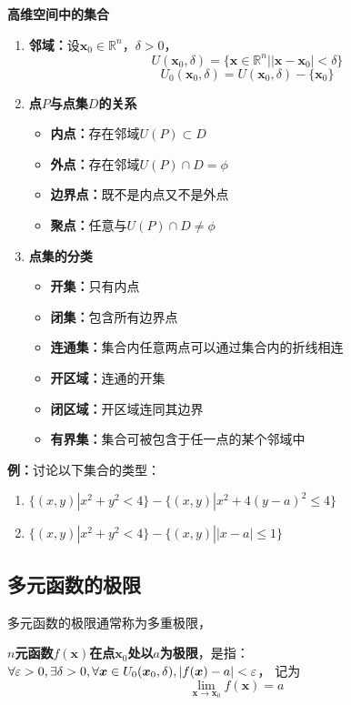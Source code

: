 \begin{shaded}
	{\bf 高维空间中的集合}
	
	\begin{enumerate}
	  \item {\bf 邻域：}设$\bm{x}_0\in\mathbb{R}^n$，$\delta>0$，
	  $$U(\bm{x}_0,\delta)=\{\bm{x}\in\mathbb{R}^n||\bm{x}-\bm{x}_0|<\delta\}$$
	  $$U_0(\bm{x}_0,\delta)=U(\bm{x}_0,\delta)-\{\bm{x}_0\}$$
	  \item {\bf 点$P$与点集$D$的关系}
	  \begin{itemize}
	    \item {\bf 内点：}存在邻域$U(P)\subset D$
	    \item {\bf 外点：}存在邻域$U(P)\cap D=\phi$
	    \item {\bf 边界点：}既不是内点又不是外点
	    \item {\bf 聚点：}任意与$U(P)\cap D\ne\phi$
	  \end{itemize}
	  \item {\bf 点集的分类}
	  \begin{itemize}
	    \item {\bf 开集：}只有内点 
	  	\item {\bf 闭集：}包含所有边界点 
	  	\item {\bf 连通集：}集合内任意两点可以通过集合内的折线相连 
	  	\item {\bf 开区域：}连通的开集 
	  	\item {\bf 闭区域：}开区域连同其边界 
	  	\item {\bf 有界集：}集合可被包含于任一点的某个邻域中
	  \end{itemize}
	\end{enumerate}
	
	{\bf 例：}讨论以下集合的类型：
	\begin{enumerate}[(1)]
  	  \setlength{\itemindent}{1cm}
	  \item $\{(x,y)|x^2+y^2<4\}-\{(x,y)|x^2+4(y-a)^2\leq 4\}$
	  \item $\{(x,y)|x^2+y^2<4\}-\{(x,y)||x-a|\leq 1\}$
	\end{enumerate}
\end{shaded}

\subsection{多元函数的极限}

多元函数的极限通常称为多重极限，
\begin{thx}
	{\bf $n$元函数$f(\bm{x})$在点$\bm{x}_0$处以$a$为极限}，是指：
	$\forall\varepsilon>0,\exists\delta>0,\forall \bm{x}\in U_0(\bm{x}_0,\delta),
	|f(\bm{x})-a|<\varepsilon$，
	记为
	$${\lim\limits_{\bm{x}\to\bm{x}_0}f(\bm{x})=a}$$
\end{thx}

